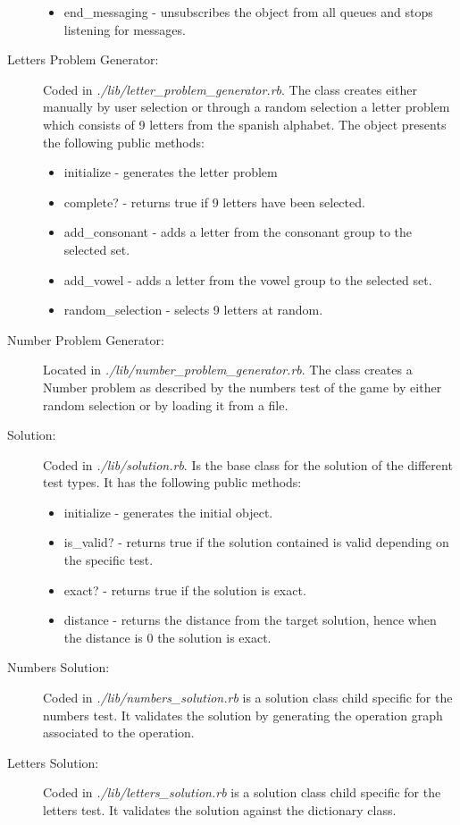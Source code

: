 \documentclass[a4paper,10pt,titlepage]{article}
\begin{document}
\begin{description}
\begin{itemize}
		\item end\_messaging - unsubscribes the object from all queues and stops listening for messages.
	\end{itemize}
	\item[Letters Problem Generator:] Coded in \textit{./lib/letter\_problem\_generator.rb}. The class creates either manually by user selection or through a random selection a letter problem which consists of 9 letters from the spanish alphabet. The object presents the following public methods:
	\begin{itemize}
		\item initialize - generates the letter problem 
		\item complete? - returns true if 9 letters have been selected.
		\item add\_consonant - adds a letter from the consonant group to the selected set. 
		\item add\_vowel - adds a letter from the vowel group to the selected set. 
		\item random\_selection - selects 9 letters at random. 
	\end{itemize} 
	\item[Number Problem Generator:] Located in \textit{./lib/number\_problem\_generator.rb}. The class creates a Number problem as described by the numbers test of the game by either random selection or by loading it from a file. 
	\item[Solution:] Coded in \textit{./lib/solution.rb}. Is the base class for the solution of the different test types. It has the following public methods:
	\begin{itemize}
		\item initialize - generates the initial object.
		\item is\_valid? - returns true if the solution contained is valid depending on the specific test.
		\item exact? - returns true if the solution is exact.
		\item distance - returns the distance from the target solution, hence when the distance is 0 the solution is exact.
	\end{itemize}
	\item[Numbers Solution:]  Coded in \textit{./lib/numbers\_solution.rb} is a solution class child specific for the numbers test. It validates the solution by generating the operation graph associated to the operation.
	\item[Letters Solution:] Coded in \textit{./lib/letters\_solution.rb} is a solution class child specific for the letters test. It validates the solution against the dictionary class. 

\end{description}
\end{document}
